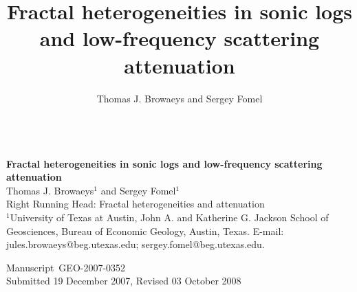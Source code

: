 

%





\thispagestyle{empty}
\begin{center}

~~\\[3cm]

{\bf\Large Fractal heterogeneities in sonic logs and low-frequency scattering attenuation}\\[1cm]

{Thomas J. Browaeys$^{1}$ and Sergey Fomel$^{1}$}\\[2cm]

Right Running Head: Fractal heterogeneities and attenuation\\[1cm]

$^{1}$University of Texas at Austin, John A. and Katherine G. Jackson School of Geosciences, Bureau of Economic Geology, Austin, Texas.
E-mail: jules.browaeys@beg.utexas.edu; sergey.fomel@beg.utexas.edu.\\[3cm]

\end{center}
\noindent
Manuscript~GEO-2007-0352\\
Submitted 19 December 2007, Revised 03 October 2008


\pagebreak




\title{Fractal heterogeneities in sonic logs\\ and low-frequency scattering attenuation}

\renewcommand{\thefootnote}{\fnsymbol{footnote}} 


\author{Thomas J. Browaeys and Sergey Fomel}

\footer{}

\maketitle


\pagebreak


